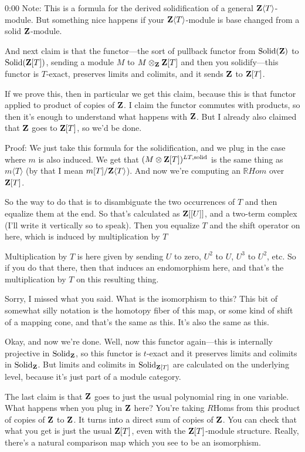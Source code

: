 \begin{unfinished}{0:00}
Note: This is a formula for the derived solidification of a general $\mathbf Z\langle T \rangle$-module. But something nice happens if your $\mathbf Z\langle T \rangle$-module is base changed from a solid $\mathbf Z$-module.

And next claim is that the functor---the sort of pullback functor from $\mathrm{Solid}(\mathbf Z)$ to $\mathrm{Solid}(\mathbf Z[T])$, sending a module $M$ to $M\otimes_\mathbf Z\mathbf Z[T]$ and then you solidify---this functor is $T$-exact, preserves limits and colimits, and it sends $\mathbf Z$ to $\mathbf Z[T]$.

If we prove this, then in particular we get this claim, because this is that functor applied to product of copies of $\mathbf Z$. I claim the functor commutes with products, so then it's enough to understand what happens with $\mathbf Z$. But I already also claimed that $\mathbf Z$ goes to $\mathbf Z[T]$, so we'd be done.

Proof: We just take this formula for the solidification, and we plug in the case where $m$ is also induced. We get that $(M\otimes \mathbf Z[T])^{LT,\mathrm{solid}}$ is the same thing as $m\langle T\rangle$ (by that I mean $m[T]/\mathbf Z\langle T\rangle$). And now we're computing an $\mathbb{R}Hom$ over $\mathbf Z[T]$.

So the way to do that is to disambiguate the two occurrences of $T$ and then equalize them at the end. So that's calculated as $\mathbf Z[[U]]$, and a two-term complex (I'll write it vertically so to speak). Then you equalize $T$ and the shift operator on here, which is induced by multiplication by $T$

Multiplication by $T$ is here given by sending $U$ to zero, $U^2$ to $U$, $U^3$ to $U^2$, etc. So if you do that there, then that induces an endomorphism here, and that's the multiplication by $T$ on this resulting thing.

Sorry, I missed what you said. What is the isomorphism to this? This bit of somewhat silly notation is the homotopy fiber of this map, or some kind of shift of a mapping cone, and that's the same as this. It's also the same as this.

Okay, and now we're done. Well, now this functor again---this is internally projective in $\mathrm{Solid}_\mathbf Z$, so this functor is $t$-exact and it preserves limits and colimits in $\mathrm{Solid}_\mathbf Z$. But limits and colimits in $\mathrm{Solid}_{\mathbf Z[T]}$ are calculated on the underlying level, because it's just part of a module category.

The last claim is that $\mathbf Z$ goes to just the usual polynomial ring in one variable. What happens when you plug in $\mathbf Z$ here? You're taking $R\mathrm{Hom}$s from this product of copies of $\mathbf Z$ to $\mathbf Z$. It turns into a direct sum of copies of $\mathbf Z$. You can check that what you get is just the usual $\mathbf Z[T]$, even with the $\mathbf Z[T]$-module structure. Really, there's a natural comparison map which you see to be an isomorphism.


\end{unfinished}
